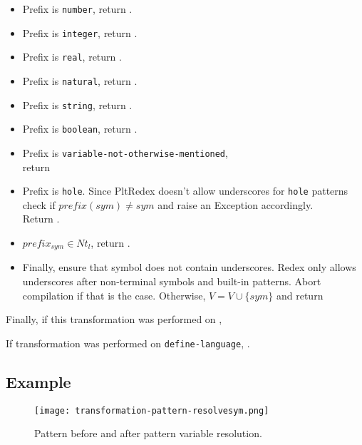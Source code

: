 \begin{itemize}
\item Prefix is \texttt{number}, return \BuiltInPattern[Number][$sym$][false].
\item Prefix is \texttt{integer}, return \BuiltInPattern[Integer][$sym$][false].
\item Prefix is \texttt{real}, return \BuiltInPattern[Real][$sym$][false].
\item Prefix is \texttt{natural}, return \BuiltInPattern[Natural][$sym$][false].
\item Prefix is \texttt{string}, return \BuiltInPattern[String][$sym$][false].
\item Prefix is \texttt{boolean}, return \BuiltInPattern[Boolean][$sym$][false].
\item Prefix is \texttt{variable-not-otherwise-mentioned}, \\ return \BuiltInPattern[Variable][$sym$][false]
\item Prefix is \texttt{hole}. Since PltRedex doesn't allow underscores for \texttt{hole} patterns check if $prefix(sym) \neq sym$ and raise an Exception accordingly. \\ Return \BuiltInPattern[Hole][$sym$][false].
\item $prefix_{sym} \in Nt_l$, return .
\item Finally, ensure that symbol does not contain underscores. Redex only allows underscores after non-terminal symbols and built-in patterns. Abort compilation if that is the case. Otherwise, $V=V\cup\{sym\}$ and return \LiteralPattern[Variable][$sym$][false]
\end{itemize}

Finally, if this transformation was performed on , 

If transformation was performed on \texttt{define-language}, .

\subsection{Example}

\begin{figure}[H]
\texttt{[image: transformation-pattern-resolvesym.png]}
\caption{Pattern before and after pattern variable resolution.}
\label{transformation-pattern-resolvesym}
\end{figure}

